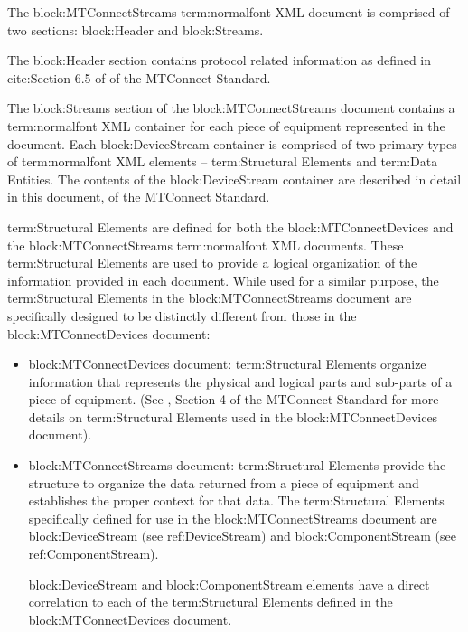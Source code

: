 The {block:MTConnectStreams} {term:normalfont XML} document is comprised of two sections: {block:Header} and {block:Streams}.

The {block:Header} section contains protocol related information as defined in {cite:Section 6.5} of  of the MTConnect Standard.

The {block:Streams} section of the {block:MTConnectStreams} document contains a  {term:normalfont XML} container for each piece of equipment represented in the document.  Each {block:DeviceStream} container is comprised of two primary types of {term:normalfont XML} elements – {term:Structural Elements} and {term:Data Entities}.  The contents of the {block:DeviceStream} container are described in detail in this document,  of the MTConnect Standard.

{term:Structural Elements} are defined for both the {block:MTConnectDevices} and the {block:MTConnectStreams} {term:normalfont XML} documents.  These {term:Structural Elements} are used to provide a logical organization of the information provided in each document.  While used for a similar purpose, the {term:Structural Elements} in the {block:MTConnectStreams} document are specifically designed to be distinctly different from those in the {block:MTConnectDevices} document:  

\begin{itemize}

\item {block:MTConnectDevices} document: {term:Structural Elements} organize information that represents the physical and logical parts and sub-parts of a piece of equipment.  (See , Section 4 of the MTConnect Standard for more details on {term:Structural Elements} used in the {block:MTConnectDevices} document).  

\item {block:MTConnectStreams} document: {term:Structural Elements} provide the structure to organize the data returned from a piece of equipment and establishes the proper context for that data.  The {term:Structural Elements} specifically defined for use in the {block:MTConnectStreams} document are {block:DeviceStream} (see {ref:DeviceStream}) and {block:ComponentStream} (see {ref:ComponentStream}).   

{block:DeviceStream} and {block:ComponentStream} elements have a direct correlation to each of the {term:Structural Elements} defined in the {block:MTConnectDevices} document.
\end{itemize}

